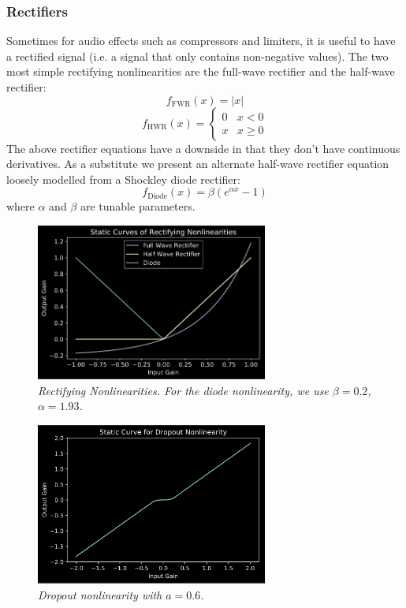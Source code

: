 \documentclass[twoside,a4paper]{article}
\begin{document}
\subsubsection{Rectifiers} \label{sec:rect}
%
Sometimes for audio effects such as compressors and limiters, it is
useful to have a rectified signal (i.e. a signal that only contains
non-negative values). The two most simple rectifying nonlinearities
are the full-wave rectifier and the half-wave rectifier:
%
\begin{equation}
    f_{\text{FWR}}(x) = |x|
    \label{eq:fwr}
\end{equation}
%
\begin{equation}
    f_{\text{HWR}}(x) = \begin{cases}
        0& x < 0 \\
        x& x \geq 0
    \end{cases}
    \label{eq:hwr}
\end{equation}
%
The above rectifier equations have a downside in that they don't have
continuous derivatives. As a substitute we present an alternate
half-wave rectifier equation loosely modelled from a Shockley diode
rectifier:
\begin{equation}
    f_{\text{Diode}}(x) = \beta \left(e^{\alpha x} - 1 \right)
    \label{eq:diode}
\end{equation}
%
where $\alpha$ and $\beta$ are tunable parameters.
%
\begin{figure}[!htb]
    \center
    \includegraphics[width=3in]{../Exciter/Pics/rect_static.png}
    \caption{\label{Rects}{\it Rectifying Nonlinearities. For the diode nonlinearity,
    we use $\beta = 0.2$, $\alpha = 1.93$.}}
\end{figure}
%
\begin{figure}[!htb]
    \center
    \includegraphics[width=3in]{Pics/dropout.png}
    \caption{\label{Drops}{\it Dropout nonlinearity with $a = 0.6$.}}
\end{figure}
%
\end{document}
